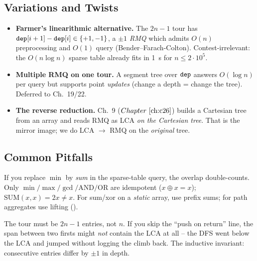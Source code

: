 \subsection{Variations and Twists}

\begin{itemize}[nosep]
  \item \textbf{Farmer's linearithmic alternative.}  The \(2n\!-\!1\) tour
        has \(\texttt{dep}[i+1] - \texttt{dep}[i] \in \{+1,-1\}\), a
        \emph{\(\pm 1\) RMQ} which admits \(O(n)\) preprocessing and \(O(1)\)
        query (Bender--Farach-Colton).  Contest-irrelevant: the \(O(n\log n)\)
        sparse table already fits in 1~s for \(n\le2\cdot10^{5}\).  \hfill{}
  \item \textbf{Multiple RMQ on one tour.}  A segment tree over
        \(\texttt{dep}\) answers \(O(\log n)\) per query but supports point
        \emph{updates} (change a depth = change the tree).  Deferred to
        Ch.~19/22.  \hfill{}
  \item \textbf{The reverse reduction.}  Ch.~9 (\(\chref{c26}\)) builds a
        Cartesian tree from an array and reads RMQ as LCA \emph{on the
        Cartesian tree}.  That is the mirror image; we do LCA \(\to\) RMQ
        on the \emph{original} tree.  \hfill{}
\end{itemize}

\subsection{Common Pitfalls}

\begin{warningbox}
If you replace \(\min\) by \emph{sum} in the sparse-table query, the
overlap double-counts.  Only \(\min/\max/\gcd/\text{AND}/\text{OR}\) are
idempotent (\(x \oplus x = x\)); \(\text{SUM}(x,x) = 2x \ne x\).  For
sum/xor on a \emph{static} array, use prefix sums; for path aggregates
use lifting ().
\end{warningbox}

\begin{warningbox}
The tour must be \(2n-1\) entries, not \(n\).  If you skip the
``push on return'' line, the span between two firsts might \emph{not}
contain the LCA at all -- the DFS went below the LCA and jumped without
logging the climb back.  The inductive invariant: consecutive entries
differ by \(\pm 1\) in depth.
\end{warningbox}

